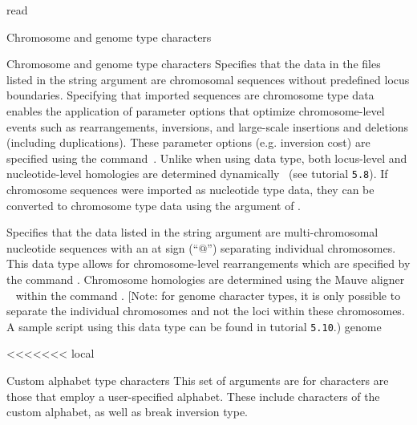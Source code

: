 \begin{command}{read}{}
\begin{arguments}
\begin{argumentgroup}{Chromosome and genome type characters}
\begin{argumentgroup}{Chromosome and genome type characters}
                {Specifies that the data in the files listed in the string argument
                are chromosomal sequences without predefined locus boundaries.
                Specifying that imported sequences are chromosome type data enables
                the application of parameter options that optimize chromosome-level
                events such as rearrangements, inversions, and large-scale
                insertions and deletions (including duplications). These parameter
                options (e.g. inversion cost) are specified using the
                command~.  
                Unlike when using  data type,
                both locus-level and nucleotide-level homologies
                are determined dynamically~\cite{darlingetal2004, vinh2007} 
                (see tutorial \texttt{5.8}). If chromosome sequences were imported as
                nucleotide type data, they can be converted to chromosome type data
                using the   argument of
                .} 
                {}
            
                {Specifies that the data listed in the string argument are
                multi-chromosomal nucleotide sequences with an at sign (``$@$'')  
                separating individual chromosomes. This data type
                allows for chromosome-level rearrangements which are specified by
                the command . Chromosome
                homologies are determined using the Mauve aligner ~\cite{darlingetal2004} within          
                the command . [Note: for genome
                character types, it is only possible to separate the individual chromosomes and 
                not the loci within these chromosomes.  A sample script using this data type 
                can be found in tutorial \texttt{5.10}.)} 
                {genome}

        \end{argumentgroup}
   
   
<<<<<<< local
   \begin{argumentgroup}{Custom alphabet type characters}
	This set of arguments are for characters are those that employ a user-specified alphabet. These include
	characters of the custom alphabet, as well as break inversion type.
	

\end{argumentgroup}
\end{argumentgroup}
\end{arguments}
\end{command}
